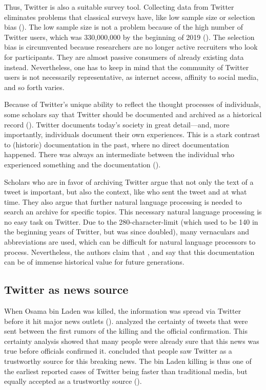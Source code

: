 Thus, Twitter is also a suitable survey tool. Collecting data from Twitter eliminates problems that classical surveys have, like low sample size or selection bias (\cite{takabeTwitterSurveyTool2016}). The low sample size is not a problem because of the high number of Twitter users, which was 330,000,000 by the beginning of 2019 (\cite{TwitterMonthlyActive}). The selection bias is circumvented because researchers are no longer active recruiters who look for participants. They are almost passive consumers of already existing data instead. Nevertheless, one has to keep in mind that the community of Twitter users is not necessarily representative, as internet access, affinity to social media, and so forth varies. %

Because of Twitter's unique ability to reflect the thought processes of individuals, some scholars say that Twitter should be documented and archived as a historical record (\cite{risse2014documenting}). Twitter documents today's society in great detail---and, more importantly, individuals document their own experiences. This is a stark contrast to (historic) documentation in the past, where no direct documentation happened. There was always an intermediate between the individual who experienced something and the documentation (\citeauthor{risse2014documenting}).

Scholars who are in favor of archiving Twitter argue that not only the text of a tweet is important, but also the context, like who sent the tweet and at what time. They also argue that further natural language processing is needed to search an archive for specific topics. This necessary natural language processing is no easy task on Twitter. Due to the 280-character-limit (which used to be 140 in the beginning years of Twitter, but was since doubled), many vernaculars and abbreviations are used, which can be difficult for natural language processors to process. Nevertheless, the authors claim that  \parencite[9]{risse2014documenting}, and say that this documentation can be of immense historical value for future generations.

\subsection{Twitter as news source}  %
When Osama bin Laden was killed, the information was spread via Twitter before it hit major news outlets (\cite{hu2012breaking}). \citeauthor{hu2012breaking} analyzed the certainty of tweets that were sent between the first rumors of the killing and the official confirmation. This certainty analysis showed that many people were already sure that this news was true before officials confirmed it. \citeauthor{hu2012breaking} concluded that people saw Twitter as a trustworthy source for this breaking news. The bin Laden killing is thus one of the earliest reported cases of Twitter being faster than traditional media, but equally accepted as a trustworthy source (\cite[2751]{hu2012breaking}).

